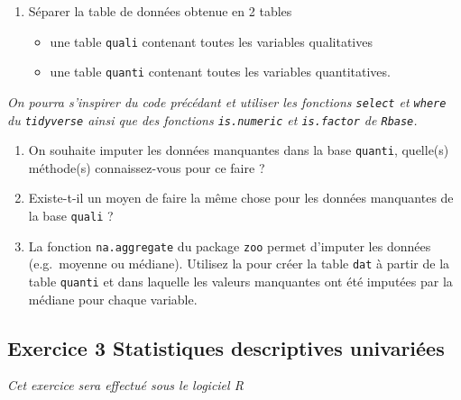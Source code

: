 \documentclass[
]{article}
\providecommand{\tightlist}{%
  \setlength{\itemsep}{0pt}\setlength{\parskip}{0pt}}
\begin{document}
\begin{enumerate}
\def\labelenumi{\arabic{enumi}.}
\setcounter{enumi}{7}
\item
  Séparer la table de données obtenue en 2 tables

  \begin{itemize}
  \tightlist
  \item
    une table \texttt{quali} contenant toutes les variables qualitatives
  \item
    une table \texttt{quanti} contenant toutes les variables
    quantitatives.
  \end{itemize}
\end{enumerate}

\emph{On pourra s'inspirer du code précédant et utiliser les fonctions
\texttt{select} et \texttt{where} du \texttt{tidyverse} ainsi que des
fonctions \texttt{is.numeric} et \texttt{is.factor} de \texttt{Rbase}.}

\begin{enumerate}
\def\labelenumi{\arabic{enumi}.}
\setcounter{enumi}{9}
\item
  On souhaite imputer les données manquantes dans la base
  \texttt{quanti}, quelle(s) méthode(s) connaissez-vous pour ce faire ?
\item
  Existe-t-il un moyen de faire la même chose pour les données
  manquantes de la base \texttt{quali} ?
\item
  La fonction \texttt{na.aggregate} du package \texttt{zoo} permet
  d'imputer les données (e.g.~moyenne ou médiane). Utilisez la pour
  créer la table \texttt{dat} à partir de la table \texttt{quanti} et
  dans laquelle les valeurs manquantes ont été imputées par la médiane
  pour chaque variable.
\end{enumerate}

\subsection{Exercice 3 Statistiques descriptives
univariées}\label{exercice-3-statistiques-descriptives-univariuxe9es}

\emph{Cet exercice sera effectué sous le logiciel R}
\end{document}
